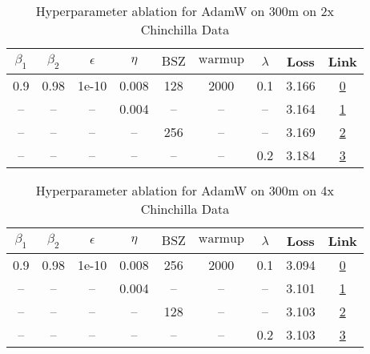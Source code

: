 \begin{table}[H]
\centering
\caption{Hyperparameter ablation for AdamW on 300m on 2x Chinchilla Data}
\label{tab:ablation_adamw_300m_2}
\begin{tabular}{ccccccccc}
\toprule
$\beta_1$ & $\beta_2$ & $\epsilon$ & $\eta$ & $\mathrm{BSZ}$ & $\mathrm{warmup}$ & $\lambda$ & Loss & Link \\
\midrule
0.9 & 0.98 & 1e-10 & 0.008 & 128 & 2000 & 0.1 & 3.166 & \href{https://wandb.ai/stanford-mercury/optimizer-scaling/runs/sweep-300m-12B-adamwo5dcabdlr0.008-wd0.1-minlr0-warmup2000-b10.9-3d4fae}{0} \\
\midrule
-- & -- & -- & 0.004 & -- & -- & -- & 3.164 & \href{https://wandb.ai/stanford-mercury/optimizer-scaling/runs/sweep-300m-12B-adamwvae7cf4lr0.004-wd0.1-minlr0-warmup2000-b10.9-2dca32}{1} \\
-- & -- & -- & -- & 256 & -- & -- & 3.169 & \href{https://wandb.ai/stanford-mercury/optimizer-scaling/runs/sweep-300m-12B-adamwo6cb296lr0.008-wd0.1-minlr0-warmup2000-b10.9-3dedfd}{2} \\
-- & -- & -- & -- & -- & -- & 0.2 & 3.184 & \href{https://wandb.ai/stanford-mercury/optimizer-scaling/runs/sweep-300m-12B-adamwk4476fflr0.008-wd0.2-minlr0-warmup2000-b10.9-2177e1}{3} \\
\bottomrule
\end{tabular}
\end{table}

\begin{table}[H]
\centering
\caption{Hyperparameter ablation for AdamW on 300m on 4x Chinchilla Data}
\label{tab:ablation_adamw_300m_4}
\begin{tabular}{ccccccccc}
\toprule
$\beta_1$ & $\beta_2$ & $\epsilon$ & $\eta$ & $\mathrm{BSZ}$ & $\mathrm{warmup}$ & $\lambda$ & Loss & Link \\
\midrule
0.9 & 0.98 & 1e-10 & 0.008 & 256 & 2000 & 0.1 & 3.094 & \href{https://wandb.ai/stanford-mercury/optimizer-scaling/runs/sweep-300m-24B-adamw5dcabdlr0.008-wd0.1-minlr0-warmup2000-b10.9--5e75fb}{0} \\
\midrule
-- & -- & -- & 0.004 & -- & -- & -- & 3.101 & \href{https://wandb.ai/stanford-mercury/optimizer-scaling/runs/sweep-300m-24B-adamwae7cf4lr0.004-wd0.1-minlr0-warmup2000-b10.9--ee3fd2}{1} \\
-- & -- & -- & -- & 128 & -- & -- & 3.103 & \href{https://wandb.ai/stanford-mercury/optimizer-scaling/runs/sweep-300m-24B-adamw07fc6elr0.008-wd0.1-minlr0-warmup2000-b10.9--459481}{2} \\
-- & -- & -- & -- & -- & -- & 0.2 & 3.103 & \href{https://wandb.ai/stanford-mercury/optimizer-scaling/runs/sweep-300m-24B-adamw4476fflr0.008-wd0.2-minlr0-warmup2000-b10.9--1eec01}{3} \\
\bottomrule
\end{tabular}
\end{table}


